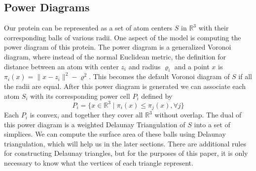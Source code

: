 \documentclass{article}
\newcommand{\R}{\mathbb{R}}
\begin{document}
\subsection{Power Diagrams}

Our protein can be represented as a set of atom centers $S$ in $\R^3$ with their corresponding balls of various radii. One aspect of the model is computing the power diagram of this protein. The power diagram is a generalized Voronoi diagram, where instead of the normal Euclidean metric, the definition for distance between an atom with center $z_i$ and radius $\varrho_i$ and a point $x$ is $\pi_i(x)=\|x-z_i\|^2-\varrho^2$. This becomes the default Voronoi diagram of $S$ if all the radii are equal. After this power diagram is generated we can associate each atom $S_i$ with its corresponding power cell $P_i$ defined by
\begin{equation*}
P_i=\{x\in\R^3\mid\pi_i(x)\leq\pi_j(x),\forall j\}
\end{equation*}
Each $P_i$ is convex, and together they cover all $\R^3$ without overlap. The dual of this power diagram is a weighted Delaunay Triangulation of $S$ into a set of simplices. We can compute the surface area of these balls using Delaunay triangulation, which will help us in the later sections. There are additional rules for constructing Delaunay triangles, but for the purposes of this paper, it is only necessary to know what the vertices of each triangle represent. 

\end{document}
